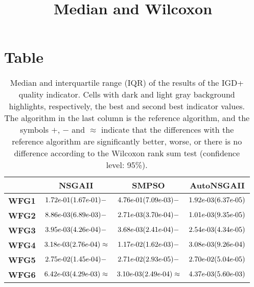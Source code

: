 \documentclass{article}
\title{Median and Wilcoxon}
\author{}
\begin{document}
\maketitle
\section{Table}
\begin{table}[!htp]
  \caption{Median and interquartile range (IQR) of the results of the IGD+ quality indicator. Cells with dark and light gray background highlights, respectively, the best and second best indicator values. The algorithm in the last column is the reference algorithm, and the symbols $+$, $-$ and $\approx$ indicate that the differences with the reference algorithm are significantly better, worse, or there is no difference according to the Wilcoxon rank sum test (confidence level: 95\%).}
  \label{table:IGD+}
  \centering
  \begin{tiny}
  \begin{tabular}{c|ccc}
      & \textbf{NSGAII} & \textbf{SMPSO} & \textbf{AutoNSGAII} \\\hline
\textbf{WFG1} & $\cellcolor{gray25} {1.72e\makebox[0.1cm]{-}01(1.67e\makebox[0.1cm]{-}01)-} $ & $ {4.76e\makebox[0.1cm]{-}01(7.09e\makebox[0.1cm]{-}03)-} $ & $ \cellcolor{gray95} 1.92e\makebox[0.1cm]{-}03(6.37e\makebox[0.1cm]{-}05)$ \\
\textbf{WFG2} & ${8.86e\makebox[0.1cm]{-}03(6.89e\makebox[0.1cm]{-}03)-} $ & $ \cellcolor{gray25} {2.71e\makebox[0.1cm]{-}03(3.70e\makebox[0.1cm]{-}04)-} $ & $ \cellcolor{gray95} 1.01e\makebox[0.1cm]{-}03(9.35e\makebox[0.1cm]{-}05)$ \\
\textbf{WFG3} & ${3.95e\makebox[0.1cm]{-}03(4.26e\makebox[0.1cm]{-}04)-} $ & $ \cellcolor{gray25} {3.68e\makebox[0.1cm]{-}03(2.41e\makebox[0.1cm]{-}04)-} $ & $ \cellcolor{gray95} 2.54e\makebox[0.1cm]{-}03(4.34e\makebox[0.1cm]{-}05)$ \\
\textbf{WFG4} & $\cellcolor{gray25} {3.18e\makebox[0.1cm]{-}03(2.76e\makebox[0.1cm]{-}04)\approx} $ & $ {1.17e\makebox[0.1cm]{-}02(1.62e\makebox[0.1cm]{-}03)-} $ & $ \cellcolor{gray95} 3.08e\makebox[0.1cm]{-}03(9.26e\makebox[0.1cm]{-}04)$ \\
\textbf{WFG5} & ${2.75e\makebox[0.1cm]{-}02(1.45e\makebox[0.1cm]{-}04)-} $ & $ \cellcolor{gray25} {2.71e\makebox[0.1cm]{-}02(2.93e\makebox[0.1cm]{-}05)-} $ & $ \cellcolor{gray95} 2.70e\makebox[0.1cm]{-}02(5.04e\makebox[0.1cm]{-}05)$ \\
\textbf{WFG6} & ${6.42e\makebox[0.1cm]{-}03(4.29e\makebox[0.1cm]{-}03)\approx} $ & $ \cellcolor{gray95} {3.10e\makebox[0.1cm]{-}03(2.49e\makebox[0.1cm]{-}04)\approx} $ & $ \cellcolor{gray25} 4.37e\makebox[0.1cm]{-}03(5.60e\makebox[0.1cm]{-}03)$ \\

\end{tabular}
\end{tiny}
\end{table}
\end{document}
